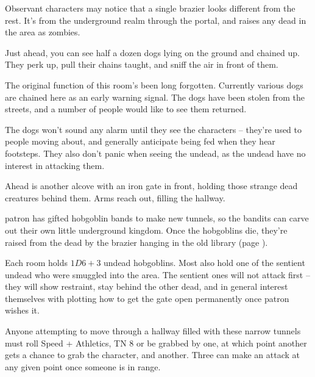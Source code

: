 Observant characters may notice that a single brazier looks different from the rest.  It's from the underground realm through the portal, and raises any dead in the area as zombies.



\begin{boxtext}
	Just ahead, you can see half a dozen dogs lying on the ground and chained up.  They perk up, pull their chains taught, and sniff the air in front of them.
\end{boxtext}

The original function of this room's been long forgotten.  Currently various dogs are chained here as an early warning signal.  The dogs have been stolen from the streets, and a number of people would like to see them returned.

The dogs won't sound any alarm until they see the characters -- they're used to people moving about, and generally anticipate being fed when they hear footsteps.  They also don't panic when seeing the undead, as the undead have no interest in attacking them.


\huntingdog



\begin{boxtext}
	Ahead is another alcove with an iron gate in front, holding those strange dead creatures behind them.  Arms reach out, filling the hallway.
\end{boxtext}

\Gls{patron} has gifted hobgoblin bands to make new tunnels, so the bandits can carve out their own little underground kingdom.  Once the hobgoblins die, they're raised from the dead by the brazier hanging in the old library (page \pageref{oldlibrary}).

Each room holds $1D6+3$ undead hobgoblins.  Most also hold one of the sentient undead who were smuggled into the area.  The sentient ones will not attack first -- they will show restraint, stay behind the other dead, and in general interest themselves with plotting how to get the gate open permanently once \gls{patron} wishes it.

\zombiehobgoblin

Anyone attempting to move through a hallway filled with these narrow tunnels must roll Speed + Athletics, TN 8 or be grabbed by one, at which point another gets a chance to grab the character, and another.  Three can make an attack at any given point once someone is in range.

